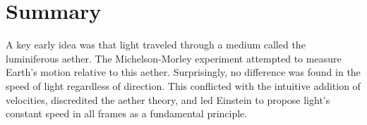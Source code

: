 





\section{Summary}

A key early idea was that light traveled through a medium called the luminiferous aether. The Michelson-Morley experiment attempted to measure Earth's motion relative to this aether. Surprisingly, no difference was found in the speed of light regardless of direction. This conflicted with the intuitive addition of velocities, discredited the aether theory, and led Einstein to propose light's constant speed in all frames as a fundamental principle.

